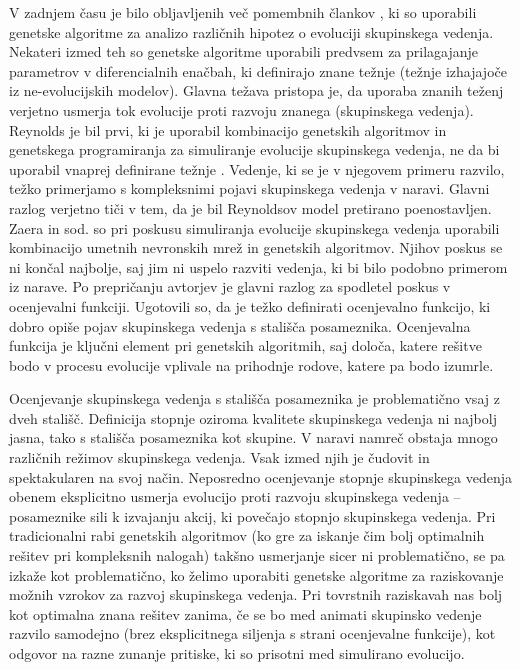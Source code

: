 \begin{razsirjeniPovzetek}
V zadnjem času je bilo obljavljenih več pomembnih člankov \cite{kunz2006prey,olson2013predator,olson2016evolution,biswas2014causes,demsar2015simulating,demsar2016balanced,demsar2017evolution,hein2015evolution}, ki so uporabili genetske algoritme za analizo različnih hipotez o evoluciji skupinskega vedenja. Nekateri izmed teh \cite{sayers2009evolved,spector2003emergence,wood2007evolving} so genetske algoritme uporabili predvsem za prilagajanje parametrov v diferencialnih enačbah, ki definirajo znane težnje (težnje izhajajoče iz ne-evolucijskih modelov). Glavna težava pristopa je, da uporaba znanih teženj verjetno usmerja tok evolucije proti razvoju znanega (skupinskega vedenja). Reynolds je bil prvi, ki je uporabil kombinacijo genetskih algoritmov in genetskega programiranja \cite{koza1992genetic} za simuliranje evolucije skupinskega vedenja, ne da bi uporabil vnaprej definirane težnje \cite{reynolds1993evolved}. Vedenje, ki se je v njegovem primeru razvilo, težko primerjamo s kompleksnimi pojavi skupinskega vedenja v naravi. Glavni razlog verjetno tiči v tem, da je bil Reynoldsov model pretirano poenostavljen. Zaera in sod. so pri poskusu simuliranja evolucije skupinskega vedenja uporabili kombinacijo umetnih nevronskih mrež in genetskih algoritmov. Njihov poskus se ni končal najbolje, saj jim ni uspelo razviti vedenja, ki bi bilo podobno primerom iz narave. Po prepričanju avtorjev je glavni razlog za spodletel poskus v ocenjevalni funkciji. Ugotovili so, da je težko definirati ocenjevalno funkcijo, ki dobro opiše pojav skupinskega vedenja s stališča posameznika. Ocenjevalna funkcija je ključni element pri genetskih algoritmih, saj določa, katere rešitve bodo v procesu evolucije vplivale na prihodnje rodove, katere pa bodo izumrle.

Ocenjevanje skupinskega vedenja s stališča posameznika je problematično vsaj z dveh stališč. Definicija stopnje oziroma kvalitete skupinskega vedenja ni najbolj jasna, tako s stališča posameznika kot skupine. V naravi namreč obstaja mnogo različnih režimov skupinskega vedenja. Vsak izmed njih je čudovit in spektakularen na svoj način. Neposredno ocenjevanje stopnje skupinskega vedenja obenem eksplicitno usmerja evolucijo proti razvoju skupinskega vedenja -- posameznike sili k izvajanju akcij, ki povečajo stopnjo skupinskega vedenja. Pri tradicionalni rabi genetskih algoritmov (ko gre za iskanje čim bolj optimalnih rešitev pri kompleksnih nalogah) takšno usmerjanje sicer ni problematično, se pa izkaže kot problematično, ko želimo uporabiti genetske algoritme za raziskovanje možnih vzrokov za razvoj skupinskega vedenja. Pri tovrstnih raziskavah nas bolj kot optimalna znana rešitev zanima, če se bo med animati skupinsko vedenje razvilo samodejno (brez eksplicitnega siljenja s strani ocenjevalne funkcije), kot odgovor na razne zunanje pritiske, ki so prisotni med simulirano evolucijo.


\end{razsirjeniPovzetek}
